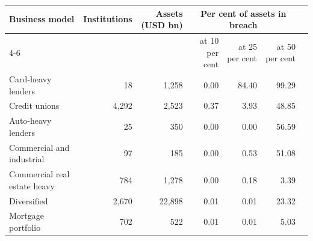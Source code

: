 \setlength{\tabcolsep}{4pt}
\begin{tabular}{lrrrrrr}
\toprule
Business model & Institutions & Assets (USD bn) & \multicolumn{3}{c}{Per cent of assets in breach} \\
\cmidrule(lr){4-6}
 & & & at 10 per cent & at 25 per cent & at 50 per cent \\
\midrule
Card-heavy lenders & 18 & 1,258 & 0.00 & 84.40 & 99.29 \\
Credit unions & 4,292 & 2,523 & 0.37 & 3.93 & 48.85 \\
Auto-heavy lenders & 25 & 350 & 0.00 & 0.00 & 56.59 \\
Commercial and industrial & 97 & 185 & 0.00 & 0.53 & 51.08 \\
Commercial real estate heavy & 784 & 1,278 & 0.00 & 0.18 & 3.39 \\
Diversified & 2,670 & 22,898 & 0.01 & 0.01 & 23.32 \\
Mortgage portfolio & 702 & 522 & 0.01 & 0.01 & 5.03 \\
\bottomrule
\end{tabular}
